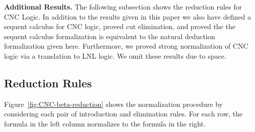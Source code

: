 \textbf{Additional Results.} The following subsection shows the
reduction rules for CNC Logic. In addition to the results given in this
paper we also have defined a sequent calculus for CNC logic, proved
cut elimination, and proved the the sequent calculus formalization is
equivalent to the natural deduction formalization given here.
Furthermore, we proved strong normalization of CNC logic via a
translation to LNL logic.  We omit these results due to space.



\subsection{Reduction Rules}
Figure~\ref{fig:CNC-beta-reduction} shows the normalization procedure
by considering each pair of introduction and elimination rules. For
each row, the formula in the left column normalizes to the formula in 
the right.
